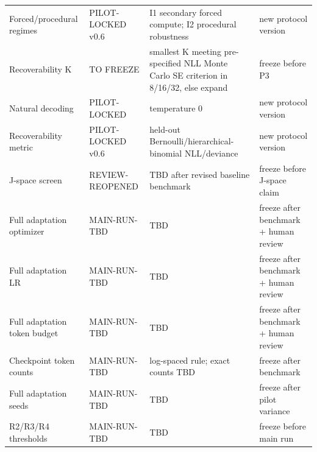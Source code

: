 \begin{longtable}{@{}p{}p{}p{}p{}@{}}
Forced/procedural regimes & PILOT-LOCKED v0.6 & I1 secondary forced compute; I2 procedural robustness & new protocol version \\
Recoverability K & TO FREEZE & smallest K meeting pre-specified NLL Monte Carlo SE criterion in 8/16/32, else expand & freeze before P3 \\
Natural decoding & PILOT-LOCKED & temperature 0 & new protocol version \\
Recoverability metric & PILOT-LOCKED v0.6 & held-out Bernoulli/hierarchical-binomial NLL/deviance & new protocol version \\
J-space screen & REVIEW-REOPENED & TBD after revised baseline benchmark & freeze before J-space claim \\
Full adaptation optimizer & MAIN-RUN-TBD & TBD & freeze after benchmark + human review \\
Full adaptation LR & MAIN-RUN-TBD & TBD & freeze after benchmark + human review \\
Full adaptation token budget & MAIN-RUN-TBD & TBD & freeze after benchmark + human review \\
Checkpoint token counts & MAIN-RUN-TBD & log-spaced rule; exact counts TBD & freeze after benchmark \\
Full adaptation seeds & MAIN-RUN-TBD & TBD & freeze after pilot variance \\
R2/R3/R4 thresholds & MAIN-RUN-TBD & TBD & freeze before main run \\
\bottomrule
\end{longtable}
